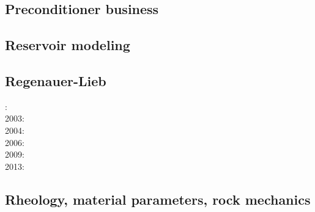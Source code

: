\subsection{Preconditioner business}

\cite{benz02}
\cite{bewa08}
\cite{urvs08}

\subsection{Reservoir modeling}

\cite{orwa13}

\subsection{Regenauer-Lieb}

{\scriptsize
{}: \cite{reyu00}\\
2003: \cite{reyu03}\\
2004: \cite{reyu04}\\
2006: \cite{rehy06}\cite{rewr06}\\
2009: \cite{reps09}\\
2013: \cite{revp13}
}

\subsection{Rheology, material parameters, rock mechanics}

